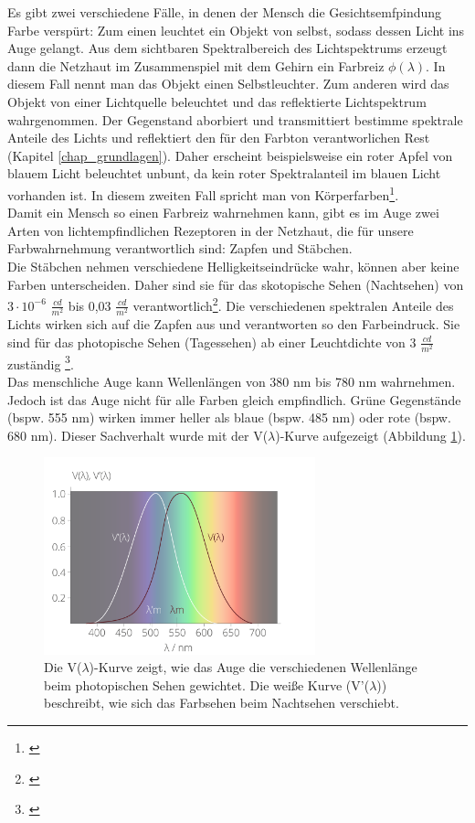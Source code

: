 Es gibt zwei verschiedene Fälle, in denen der Mensch die Gesichtsemfpindung Farbe verspürt: Zum einen leuchtet ein Objekt von selbst, sodass dessen Licht ins Auge gelangt. Aus dem sichtbaren Spektralbereich des Lichtspektrums erzeugt dann die Netzhaut im Zusammenspiel mit dem Gehirn ein Farbreiz $\phi(\lambda)$. In diesem Fall nennt man das Objekt einen Selbstleuchter. Zum anderen wird das Objekt von einer Lichtquelle beleuchtet und das reflektierte Lichtspektrum wahrgenommen. Der Gegenstand aborbiert und transmittiert bestimme spektrale Anteile des Lichts und reflektiert den für den Farbton verantworlichen Rest (Kapitel \ref{chap_grundlagen}). Daher erscheint beispielsweise ein roter Apfel von blauem Licht beleuchtet unbunt, da kein roter Spektralanteil im blauen Licht vorhanden ist.
In diesem zweiten Fall spricht man von Körperfarben\footnote{\cite[103]{hentschel}}.\\     
Damit ein Mensch so einen Farbreiz wahrnehmen kann, gibt es im Auge zwei Arten von lichtempfindlichen Rezeptoren in der Netzhaut, die für unsere Farbwahrnehmung verantwortlich sind: Zapfen und Stäbchen.\\
Die Stäbchen nehmen verschiedene Helligkeitseindrücke wahr, können aber keine Farben unterscheiden. Daher sind sie für das skotopische Sehen (Nachtsehen) von $3 \cdot 10^{-6}$ $\frac{cd}{m^{2}}$ bis 0,03 $\frac{cd}{m^{2}}$ verantwortlich\footnote{\cite{doccheck sko}}.
Die verschiedenen spektralen Anteile des Lichts wirken sich auf die Zapfen aus und verantworten so den Farbeindruck. Sie sind für das photopische Sehen (Tagessehen) ab einer Leuchtdichte von 3 $\frac{cd}{m^{2}}$ zuständig \footnote{\cite{doccheck pho}}.\\
Das menschliche Auge kann Wellenlängen von 380 nm bis 780 nm wahrnehmen. Jedoch ist das Auge nicht für alle Farben gleich empfindlich. Grüne Gegenstände (bspw. 555 nm) wirken immer heller als blaue (bspw. 485 nm) oder rote (bspw. 680 nm). Dieser Sachverhalt wurde mit der V($\lambda$)-Kurve aufgezeigt (Abbildung \ref{b_augespek}).

\begin{figure}[htp]     %
\centering
\includegraphics[width=0.7\textwidth]{bilder/augespek} 
\caption {Die V($\lambda$)-Kurve zeigt, wie das Auge die verschiedenen Wellenlänge beim photopischen Sehen gewichtet. Die weiße Kurve (V'($\lambda$)) beschreibt, wie sich das Farbsehen beim Nachtsehen verschiebt. \protect\footnotemark}\label{b_augespek}
\end{figure}

